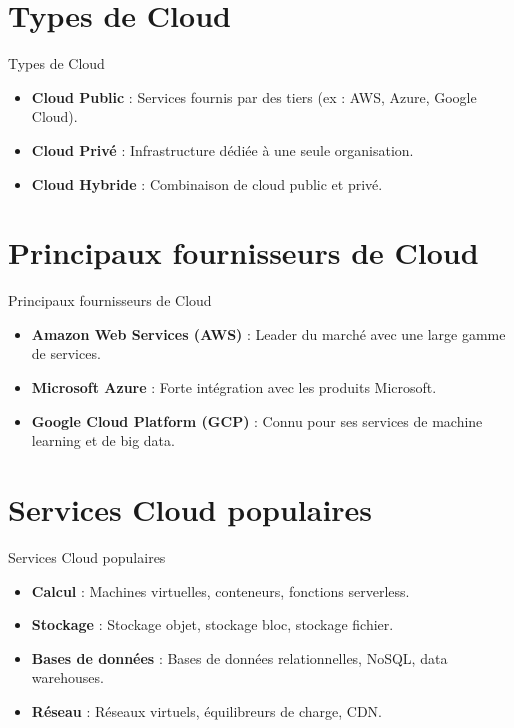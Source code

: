 \documentclass{clbeamer2024}
\begin{document}
	
	\section{Types de Cloud}
	\begin{frame}{Types de Cloud}
		\begin{itemize}
			\item \textbf{Cloud Public} : Services fournis par des tiers (ex : AWS, Azure, Google Cloud).
			\item \textbf{Cloud Privé} : Infrastructure dédiée à une seule organisation.
			\item \textbf{Cloud Hybride} : Combinaison de cloud public et privé.
		\end{itemize}
	\end{frame}
	
   \section{Principaux fournisseurs de Cloud}
   \begin{frame}{Principaux fournisseurs de Cloud}
   	\begin{itemize}
   		\item \textbf{Amazon Web Services (AWS)} : Leader du marché avec une large gamme de services.
   		\item \textbf{Microsoft Azure} : Forte intégration avec les produits Microsoft.
   		\item \textbf{Google Cloud Platform (GCP)} : Connu pour ses services de machine learning et de big data.
   	\end{itemize}
   \end{frame}
   
   \section{Services Cloud populaires}
   \begin{frame}{Services Cloud populaires}
   	\begin{itemize}
   		\item \textbf{Calcul} : Machines virtuelles, conteneurs, fonctions serverless.
   		\item \textbf{Stockage} : Stockage objet, stockage bloc, stockage fichier.
   		\item \textbf{Bases de données} : Bases de données relationnelles, NoSQL, data warehouses.
   		\item \textbf{Réseau} : Réseaux virtuels, équilibreurs de charge, CDN.
   	\end{itemize}
   \end{frame}
\end{document}

